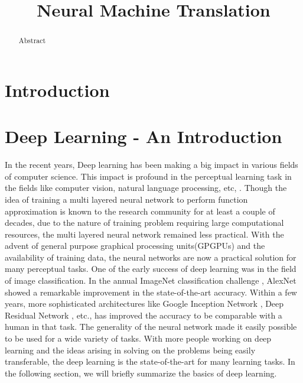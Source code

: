 \documentclass[conference]{IEEEtran}
\begin{document}
\title{Neural Machine Translation}
\vspace{-1.5cm}
\author{
\IEEEauthorblockA{\today}
}

\maketitle


\begin{abstract}
Abstract

\end{abstract}


\section{Introduction}


\section{Deep Learning - An Introduction}

In the recent  years, Deep learning has been making a big impact in various fields of computer science. This impact is profound in the perceptual learning task in the fields like computer vision, natural language processing, etc, \cite{lecun2015deep}. Though the idea of training a multi layered neural network to perform function approximation is known to the research community for at least a couple of decades\cite{schmidhuber2015deep}, due to the nature of training problem requiring large computational resources, the multi layered neural network remained less practical. With the advent of general purpose graphical processing units(GPGPUs) and the availability of training data, the neural networks are now a practical solution for many perceptual tasks. One of the early success of deep learning was in the field of image classification. In the annual ImageNet classification challenge \cite{deng2009imagenet}, AlexNet \cite{krizhevsky2012imagenet} showed a remarkable improvement in the state-of-the-art accuracy. Within a few years, more sophisticated architectures like Google Inception Network \cite{szegedy2016rethinking}, Deep Residual Network \cite{he2016deep}, etc., has improved the accuracy to be comparable with a human in that task. The generality of the neural network made it easily possible to be used for a wide variety of tasks. With more people working on deep learning and the ideas arising in solving on the problems being easily transferable, the deep learning is the state-of-the-art for many learning tasks. In the following section, we will briefly summarize the basics of deep learning.
\end{document}
